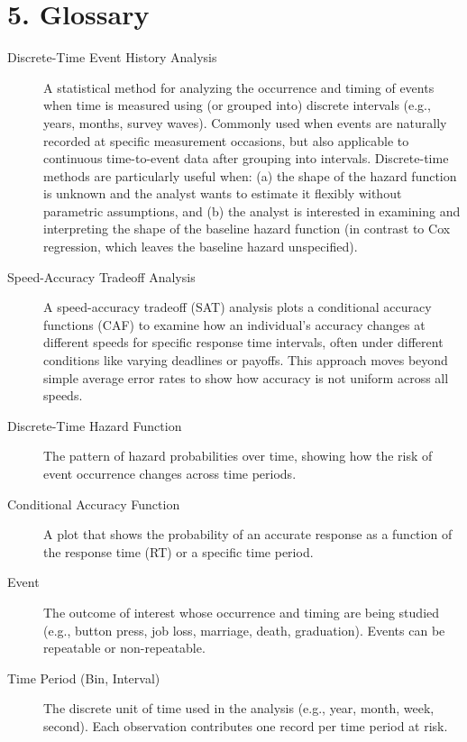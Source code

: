 \documentclass[
  english,
  man, donotrepeattitle,floatsintext]{apa6}
\begin{document}
\newpage

\section{5. Glossary}\label{glossary}

\footnotesize

\begin{description}
\item[Discrete-Time Event History Analysis] A statistical method for analyzing the occurrence and timing of events when time is measured using (or grouped into) discrete intervals (e.g., years, months, survey waves). Commonly used when events are naturally recorded at specific measurement occasions, but also applicable to continuous time-to-event data after grouping into intervals. Discrete-time methods are particularly useful when: (a) the shape of the hazard function is unknown and the analyst wants to estimate it flexibly without parametric assumptions, and (b) the analyst is interested in examining and interpreting the shape of the baseline hazard function (in contrast to Cox regression, which leaves the baseline hazard unspecified).

\item[Speed-Accuracy Tradeoff Analysis] A speed-accuracy tradeoff (SAT) analysis plots a conditional accuracy functions (CAF) to examine how an individual's accuracy changes at different speeds for specific response time intervals, often under different conditions like varying deadlines or payoffs. This approach moves beyond simple average error rates to show how accuracy is not uniform across all speeds.

\item[Discrete-Time Hazard Function] The pattern of hazard probabilities over time, showing how the risk of event occurrence changes across time periods.

\item[Conditional Accuracy Function] A plot that shows the probability of an accurate response as a function of the response time (RT) or a specific time period.

\item[Event] The outcome of interest whose occurrence and timing are being studied (e.g., button press, job loss, marriage, death, graduation). Events can be repeatable or non-repeatable.

\item[Time Period (Bin, Interval)] The discrete unit of time used in the analysis (e.g., year, month, week, second). Each observation contributes one record per time period at risk.


\end{description}
\end{document}
